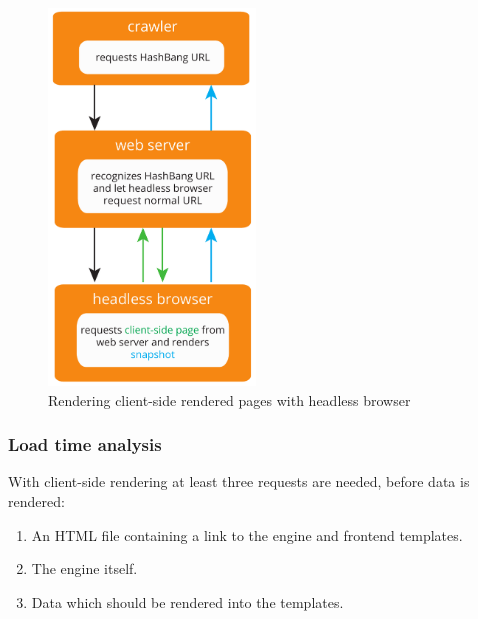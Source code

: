 \begin{figure}[H]
\centering
\includegraphics[height=10cm]{images/frontend_snapshots.pdf}
\caption[frontend_snapshots]{Rendering client-side rendered pages with headless browser}
\label{fig:frontend_snapshots}
\end{figure}

\subsubsection{Load time analysis}
With client-side rendering at least three requests are needed, before data is rendered:
\begin{enumerate}
    \item An HTML file containing a link to the \ajax{} engine and frontend templates.
    \item The \ajax{} engine itself.
    \item Data which should be rendered into the templates.
\end{enumerate}

